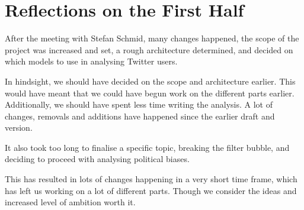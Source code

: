 \section{Reflections on the First Half}\label{sec:FirRef}
After the meeting with Stefan Schmid, many changes happened, the scope of the
project was increased and set, a rough architecture determined, and decided on which
models to use in analysing Twitter users.\nl

In hindsight, we should have decided on the scope and architecture earlier. This
would have meant that we could have begun work on the different parts earlier.
Additionally, we should have spent less time writing the analysis. A lot of
changes, removals and additions have happened since the earlier draft and
version.\nl

It also took too long to finalise a specific topic, breaking the
filter bubble, and deciding to proceed with analysing political biases.\nl

This has resulted in lots of changes happening in a very short time frame,
which has left us working on a lot of different parts. Though we consider the
ideas and increased level of ambition worth it.